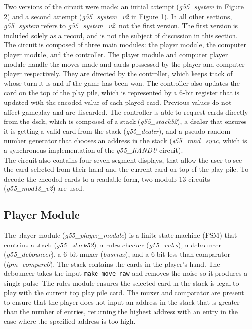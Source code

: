 \documentclass[12pt]{article}
\begin{document}
Two versions of the circuit were made: an initial attempt (\textit{g55\_system} in Figure 2) and a second attempt (\textit{g55\_system\_v2} in Figure 1). In all other sections, \textit{g55\_system} refers to \textit{g55\_system\_v2}, not the first version. The first version is included solely as a record, and is not the subject of discussion in this section. The circuit is composed of three main modules: the player module, the computer player module, and the controller. The player module and computer player module handle the moves made and cards possessed by the player and computer player respectively. They are directed by the controller, which keeps track of whose turn it is and if the game has been won. The controller also updates the card on the top of the play pile, which is represented by a 6-bit register that is updated with the encoded value of each played card. Previous values do not affect gameplay and are discarded. The controller is able to request cards directly from the deck, which is composed of a stack (\textit{g55\_stack52}), a dealer that ensures it is getting a valid card from the stack (\textit{g55\_dealer}), and a pseudo-random number generator that chooses an address in the stack (\textit{g55\_rand\_sync}, which is a synchronous implementation of the \textit{g55\_RANDU} circuit).\\

The circuit also contains four seven segment displays, that allow the user to see the card selected from their hand and the current card on top of the play pile. To decode the encoded cards to a readable form, two modulo 13 circuits (\textit{g55\_mod13\_v2}) are used.

\subsection{Player Module}

The player module (\textit{g55\_player\_module}) is a finite state machine (FSM) that contains a stack (\textit{g55\_stack52}), a rules checker (\textit{g55\_rules}), a debouncer (\textit{g55\_debouncer}), a 6-bit muxer (\textit{busmux}), and a 6-bit less than comparator (\textit{lpm\_compare0}). The stack contains the cards in the player's hand. The debouncer takes the input \texttt{make\_move\_raw} and removes the noise so it produces a single pulse. The rules module ensures the selected card in the stack is legal to play with the current top play pile card. The muxer and comparator are present to ensure that the player does not input an address in the stack that is greater than the number of entries, returning the highest address with an entry in the case where the specified address is too high. \\
\end{document}

